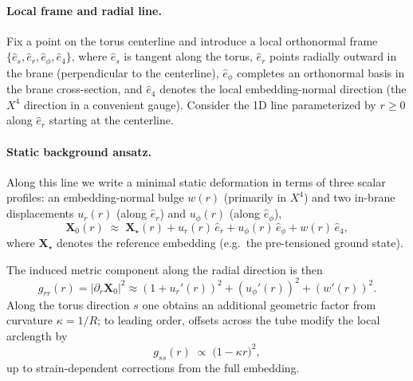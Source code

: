 \paragraph{Local frame and radial line.}
Fix a point on the torus centerline and introduce a local orthonormal frame
$\{\hat e_s,\hat e_r,\hat e_\phi,\hat e_4\}$, where $\hat e_s$ is tangent along the torus,
$\hat e_r$ points radially outward in the brane (perpendicular to the centerline),
$\hat e_\phi$ completes an orthonormal basis in the brane cross-section, and $\hat e_4$ denotes the
local embedding-normal direction (the $X^4$ direction in a convenient gauge).
Consider the 1D line parameterized by $r\ge 0$ along $\hat e_r$ starting at the centerline.

\paragraph{Static background ansatz.}
Along this line we write a minimal static deformation in terms of three scalar profiles:
an embedding-normal bulge $w(r)$ (primarily in $X^4$) and two in-brane displacements
$u_r(r)$ (along $\hat e_r$) and $u_\phi(r)$ (along $\hat e_\phi$),
\begin{equation}
\mathbf X_0(r) \;\approx\; \mathbf X_\star(r)
+ u_r(r)\,\hat e_r + u_\phi(r)\,\hat e_\phi + w(r)\,\hat e_4,
\label{eq:radial-slice-embedding}
\end{equation}
where $\mathbf X_\star$ denotes the reference embedding (e.g.\ the pre-tensioned ground state).

The induced metric component along the radial direction is then
\begin{equation}
g_{rr}(r)=|\partial_r\mathbf X_0|^2
\approx (1+u_r'(r))^2 + (u_\phi'(r))^2 + (w'(r))^2 .
\label{eq:radial-slice-grr}
\end{equation}
Along the torus direction $s$ one obtains an additional geometric factor from curvature
$\kappa=1/R$; to leading order, offsets across the tube modify the local arclength by
\begin{equation}
g_{ss}(r)\;\propto\;\bigl(1-\kappa r\bigr)^2,
\label{eq:radial-slice-gss-curvature}
\end{equation}
up to strain-dependent corrections from the full embedding.

